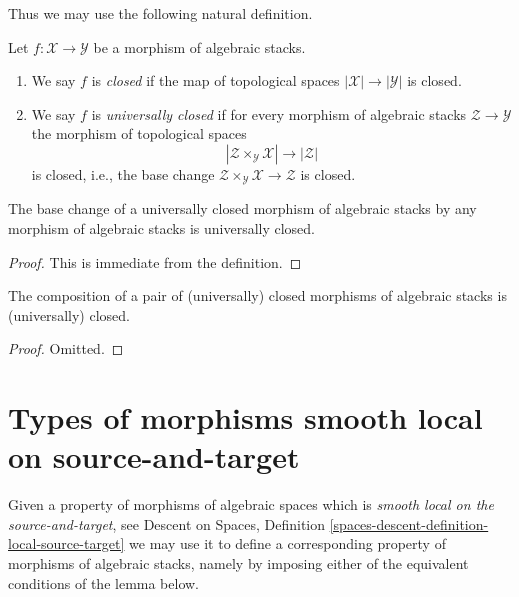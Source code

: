 \noindent
Thus we may use the following natural definition.

\begin{definition}
\label{definition-closed}
Let $f : \mathcal{X} \to \mathcal{Y}$ be a morphism of algebraic stacks.
\begin{enumerate}
\item We say $f$ is {\it closed} if the map of topological
spaces $|\mathcal{X}| \to |\mathcal{Y}|$ is closed.
\item We say $f$ is {\it universally closed} if for every morphism
of algebraic stacks $\mathcal{Z} \to \mathcal{Y}$
the morphism of topological spaces
$$
|\mathcal{Z} \times_\mathcal{Y} \mathcal{X}| \to |\mathcal{Z}|
$$
is closed, i.e., the base change
$\mathcal{Z} \times_\mathcal{Y} \mathcal{X} \to \mathcal{Z}$ is closed.
\end{enumerate}
\end{definition}

\begin{lemma}
\label{lemma-base-change-universally-closed}
The base change of a universally closed morphism of algebraic stacks
by any morphism of algebraic stacks is universally closed.
\end{lemma}

\begin{proof}
This is immediate from the definition.
\end{proof}

\begin{lemma}
\label{lemma-composition-universally-closed}
The composition of a pair of (universally) closed morphisms of
algebraic stacks is (universally) closed.
\end{lemma}

\begin{proof}
Omitted.
\end{proof}












\section{Types of morphisms smooth local on source-and-target}
\label{section-local-source-target}

\noindent
Given a property of morphisms of algebraic spaces which is
{\it smooth local on the source-and-target}, see
Descent on Spaces,
Definition \ref{spaces-descent-definition-local-source-target}
we may use it to define a corresponding
property of morphisms of algebraic stacks, namely by imposing either of
the equivalent conditions of the lemma below.

